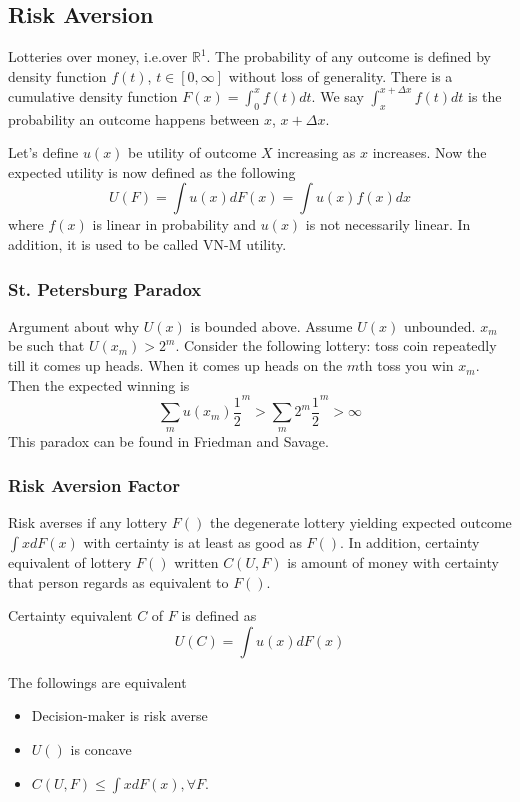 \documentclass[11pt, a4paper, oneside]{article}
\theoremstyle{definition}
\theoremstyle{proposition}
\theoremstyle{corollary}
\theoremstyle{lemma}
\theoremstyle{theorem}
\begin{document}
\subsection{Risk Aversion}
Lotteries over money, i.e.over $\mathbb{R}^1$. The probability of any outcome is defined by density function $f(t)$, $t\in[0, \infty]$ without loss of generality. There is a cumulative density function $F(x) = \int_0^x f(t)dt$. We say $\int_x^{x+\Delta x} f(t) dt$ is the probability an outcome happens between $x$, $x+\Delta x$. 

Let's define $u(x)$ be utility of outcome $X$ increasing as $x$ increases. Now the expected utility is now defined as the following
$$U(F) = \int u(x)dF(x) = \int u(x)f(x)dx$$ where $f(x)$ is linear in probability and $u(x)$ is not necessarily linear. In addition, it is used to be called VN-M utility. 

\subsubsection{St. Petersburg Paradox}
Argument about why $U(x)$ is bounded above. Assume $U(x)$ unbounded. $x_m$ be such that $U(x_m) > 2^m$. Consider the following lottery: toss coin repeatedly till it comes up heads. When it comes up heads on the $m$th toss you win $x_m$. Then the expected winning is 
$$\sum_m u(x_m) \frac{1}{2}^m > \sum_m 2^m  \frac{1}{2}^m > \infty$$
This paradox can be found in Friedman and Savage.

\subsubsection{Risk Aversion Factor}

Risk averses if any lottery $F()$ the degenerate lottery yielding expected outcome $\int xdF(x)$ with certainty is at least as good as $F()$. In addition, certainty equivalent of lottery $F()$ written $C(U, F)$ is amount of money with certainty that person regards as equivalent to $F()$. 

Certainty equivalent $C$ of $F$ is defined as 
$$U(C) = \int u(x)dF(x)$$

The followings are equivalent
\begin{itemize}
\item Decision-maker is risk averse
\item $U()$ is concave
\item $C(U, F) \leq \int x dF(x), \forall F$. 
\end{itemize}
\end{document}
